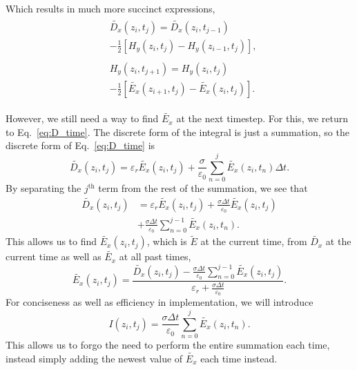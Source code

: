 \documentclass[12pt,twocolumn]{article}
\begin{document}
Which results in much more succinct expressions,
\begin{subequations}
\begin{align}
\label{eq:third_discrete_dD_dt}\begin{split}
&\tilde{D_x}(z_i,t_{j})=\tilde{D_x}(z_i,t_{j-1}) \\
&   -\frac{1}{2}\left[H_y(z_{i},t_j)-H_y(z_{i-1},t_j)\right],
\end{split} \\
\label{eq:third_discrete_dH_dt}\begin{split}
&H_y(z_i,t_{j+1}) =H_y(z_i,t_{j}) \\
    & -\frac{1}{2}\left[\tilde{E_x}(z_{i+1},t_j)-\tilde{E_x}(z_{i},t_j)\right].
\end{split}
\end{align}
\end{subequations}

 However, we still need a way to find $\tilde{E_x}$ at the next timestep. For this, we return to Eq.~\ref{eq:D_time}. The discrete form of the integral is just a summation, so the discrete form of Eq.~\ref{eq:D_time} is
\begin{equation}
\label{eq:first_discrete_D_time}\tilde{D_x}(z_i,t_j)=\varepsilon_r\tilde{E_x}(z_i,t_j)+\frac{\sigma}{\varepsilon_0}\sum_{n=0}^{j}\tilde{E_x}(z_i,t_n)\Delta t.
\end{equation}
By separating the $j^\mathrm{th}$ term from the rest of the summation, we see that
\begin{equation}
\begin{split}
\label{eq:second_discrete_D_time}\tilde{D_x}(z_i,t_j)&=\varepsilon_r\tilde{E_x}(z_i,t_j)+ \frac{\sigma\Delta t}{\varepsilon_0}\tilde{E_x}(z_i,t_j) \\
&+\frac{\sigma\Delta t}{\varepsilon_0}\sum_{n=0}^{j-1}\tilde{E_x}(z_i,t_n).
\end{split}
\end{equation}
This allows us to find $\tilde{E_x}(z_i,t_j)$, which is $\tilde{E}$ at the current time, from $\tilde{D_x}$ at the current time as well as $\tilde{E_x}$ at all past times,
\begin{equation}
\label{eq:first_discrete_E}
\tilde{E_x}(z_i,t_j) = \frac{\tilde{D_x}(z_i,t_j)-\frac{\sigma\Delta t}{\varepsilon_0}\sum_{n=0}^{j-1}\tilde{E_x}(z_i,t_j)}{\varepsilon_r+\frac{\sigma\Delta t}{\varepsilon_0}}.
\end{equation}
For conciseness as well as efficiency in implementation, we will introduce
\begin{equation}
\label{eq:first_I}
I(z_i,t_j) = \frac{\sigma\Delta t}{\varepsilon_0}\sum_{n=0}^{j}\tilde{E_x}(z_i,t_n).
\end{equation}
This allows us to forgo the need to perform the entire summation each time, instead simply adding the newest value of $\tilde{E_x}$ each time instead.
\end{document}
